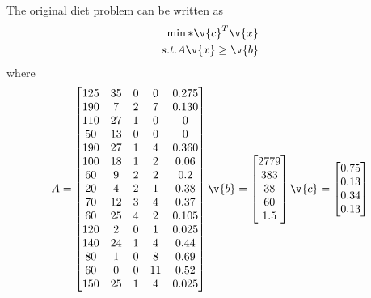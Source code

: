 \documentclass[11pt, oneside]{article}
\begin{document}
\begin{enumerate}
        The original diet problem can be written as
        \begin{align*}
            \min* \v{c}^T \v{x} \\
            s.t. A\v{x} \ge \v{b}
        \end{align*}
        where
        \begin{align*}
            A =
            \begin{bmatrix}
                125 & 35 & 0 &  0 & 0.275 \\ %
                190 &  7 & 2 &  7 & 0.130 \\ %
                110 & 27 & 1 &  0 &     0 \\ %
                 50 & 13 & 0 &  0 &     0 \\ %
                190 & 27 & 1 &  4 & 0.360 \\ %
                100 & 18 & 1 &  2 &  0.06 \\ %
                 60 &  9 & 2 &  2 &   0.2 \\ %
                 20 &  4 & 2 &  1 &  0.38 \\ %
                 70 & 12 & 3 &  4 &  0.37 \\ %
                 60 & 25 & 4 &  2 & 0.105 \\ %
                120 &  2 & 0 &  1 & 0.025 \\ %
                140 & 24 & 1 &  4 &  0.44 \\ %
                 80 &  1 & 0 &  8 &  0.69 \\ %
                 60 &  0 & 0 & 11 &  0.52 \\ %
                150 & 25 & 1 &  4 & 0.025    %
            \end{bmatrix}
            \v{b} =
            \begin{bmatrix}
                2779 \\
                 383 \\
                  38 \\
                  60 \\
                 1.5
            \end{bmatrix}
            \v{c} =
            \begin{bmatrix}
                0.75 \\ %
                0.13 \\ %
                0.34 \\ %
                0.13 \\ %

\end{bmatrix}
\end{align*}
\end{enumerate}
\end{document}
